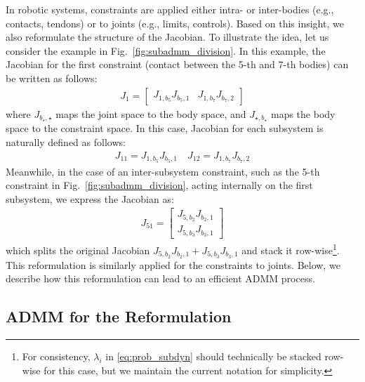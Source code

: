 \documentclass[lettersize,journal]{IEEEtran}
\begin{document}
In robotic systems, constraints are applied either intra- or inter-bodies (e.g., contacts, tendons) or to joints (e.g., limits, controls).
Based on this insight, we also reformulate the structure of the Jacobian.
To illustrate the idea, let us consider the example in Fig.~\ref{fig:subadmm_division}.
In this example, the Jacobian for the first constraint (contact between the 5-th and 7-th bodies) can be written as follows:
\begin{align*}
    J_1 = 
    \begin{bmatrix}
        J_{1,b_5}J_{b_5,1} & J_{1,b_7}J_{b_7,2}
    \end{bmatrix}
\end{align*}
where $J_{b_\star,\star}$ maps the joint space to the body space, and $J_{\star,b_\star}$ maps the body space to the constraint space.
In this case, Jacobian for each subsystem is naturally defined as follows:
\begin{align} \label{eq:jacobian_body_splitting}
    J_{11} = J_{1,b_5}J_{b_5,1} \quad J_{12} = J_{1,b_7}J_{b_7,2}
\end{align}
Meanwhile, in the case of an inter-subsystem constraint, such as the 5-th constraint in Fig.~\ref{fig:subadmm_division}, acting internally on the first subsystem, we express the Jacobian as:
\begin{align} \label{eq:sub_jacobian}
    J_{51} = 
    \begin{bmatrix}
    J_{5,b_{2}}J_{b_{2},1} \\ J_{5,b_{3}}J_{b_{3},1}
    \end{bmatrix}
\end{align}
which splits the original Jacobian $J_{5,b_{2}}J_{b_{2},1}+J_{5,b_{3}}J_{b_{3},1}$ and stack it row-wise\footnote{For consistency, $\lambda_i$ in \eqref{eq:prob_subdyn} should technically be stacked row-wise for this case, but we maintain the current notation for simplicity.}.  
This reformulation is similarly applied for the constraints to joints.
Below, we describe how this reformulation can lead to an efficient ADMM process. 

\subsection{ADMM for the Reformulation}
\end{document}
